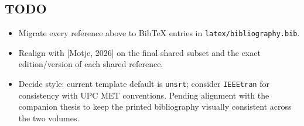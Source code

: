 \hypertarget{todo}{%
\subsection{TODO}\label{todo}}

\begin{itemize}
\tightlist
\item
  Migrate every reference above to BibTeX entries in
  \texttt{latex/bibliography.bib}.
\item
  Realign with {[}Motje, 2026{]} on the final shared subset and the
  exact edition/version of each shared reference.
\item
  Decide style: current template default is \texttt{unsrt}; consider
  \texttt{IEEEtran} for consistency with UPC MET conventions. Pending
  alignment with the companion thesis to keep the printed bibliography
  visually consistent across the two volumes.
\end{itemize}
